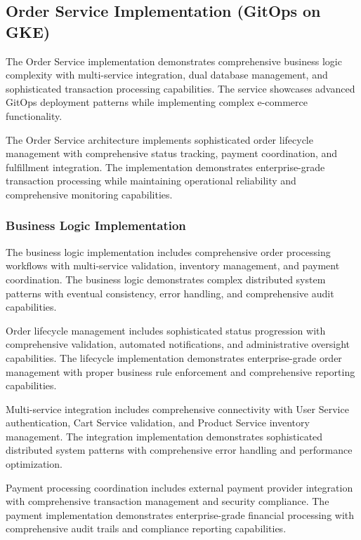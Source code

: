 \subsection{Order Service Implementation (GitOps on GKE)}

The Order Service implementation demonstrates comprehensive business logic complexity with multi-service integration, dual database management, and sophisticated transaction processing capabilities. The service showcases advanced GitOps deployment patterns while implementing complex e-commerce functionality.

The Order Service architecture implements sophisticated order lifecycle management with comprehensive status tracking, payment coordination, and fulfillment integration. The implementation demonstrates enterprise-grade transaction processing while maintaining operational reliability and comprehensive monitoring capabilities.

\subsubsection{Business Logic Implementation}

The business logic implementation includes comprehensive order processing workflows with multi-service validation, inventory management, and payment coordination. The business logic demonstrates complex distributed system patterns with eventual consistency, error handling, and comprehensive audit capabilities.

Order lifecycle management includes sophisticated status progression with comprehensive validation, automated notifications, and administrative oversight capabilities. The lifecycle implementation demonstrates enterprise-grade order management with proper business rule enforcement and comprehensive reporting capabilities.

Multi-service integration includes comprehensive connectivity with User Service authentication, Cart Service validation, and Product Service inventory management. The integration implementation demonstrates sophisticated distributed system patterns with comprehensive error handling and performance optimization.

Payment processing coordination includes external payment provider integration with comprehensive transaction management and security compliance. The payment implementation demonstrates enterprise-grade financial processing with comprehensive audit trails and compliance reporting capabilities.

